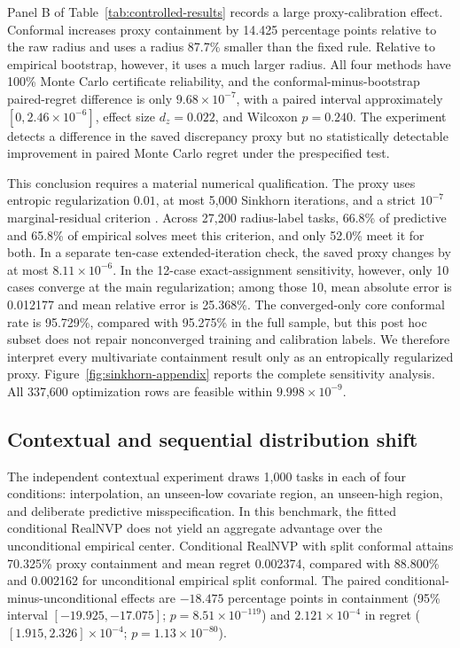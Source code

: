 \documentclass[11pt]{article}
\newcommand{\1}{\mathbf{1}}
\begin{document}
Panel B of Table~\ref{tab:controlled-results} records a large proxy-calibration effect.  Conformal increases proxy containment by 14.425 percentage points relative to the raw radius and uses a radius 87.7\% smaller than the fixed rule.  Relative to empirical bootstrap, however, it uses a much larger radius.  All four methods have 100\% Monte Carlo certificate reliability, and the conformal-minus-bootstrap paired-regret difference is only $9.68\times10^{-7}$, with a paired interval approximately $[0,2.46\times10^{-6}]$, effect size $d_z=0.022$, and Wilcoxon $p=0.240$.  The experiment detects a difference in the saved discrepancy proxy but no statistically detectable improvement in paired Monte Carlo regret under the prespecified test.

This conclusion requires a material numerical qualification.  The proxy uses entropic regularization $0.01$, at most 5,000 Sinkhorn iterations, and a strict $10^{-7}$ marginal-residual criterion \citep{peyre2019computational,feydy2019interpolating}.  Across 27,200 radius-label tasks, 66.8\% of predictive and 65.8\% of empirical solves meet this criterion, and only 52.0\% meet it for both.  In a separate ten-case extended-iteration check, the saved proxy changes by at most $8.11\times10^{-6}$.  In the 12-case exact-assignment sensitivity, however, only 10 cases converge at the main regularization; among those 10, mean absolute error is 0.012177 and mean relative error is 25.368\%.  The converged-only core conformal rate is 95.729\%, compared with 95.275\% in the full sample, but this post hoc subset does not repair nonconverged training and calibration labels.  We therefore interpret every multivariate containment result only as an entropically regularized proxy.  Figure~\ref{fig:sinkhorn-appendix} reports the complete sensitivity analysis.  All 337,600 optimization rows are feasible within $9.998\times10^{-9}$.

\subsection{Contextual and sequential distribution shift}

The independent contextual experiment draws 1,000 tasks in each of four conditions: interpolation, an unseen-low covariate region, an unseen-high region, and deliberate predictive misspecification.  In this benchmark, the fitted conditional RealNVP does not yield an aggregate advantage over the unconditional empirical center.  Conditional RealNVP with split conformal attains 70.325\% proxy containment and mean regret 0.002374, compared with 88.800\% and 0.002162 for unconditional empirical split conformal.  The paired conditional-minus-unconditional effects are $-18.475$ percentage points in containment (95\% interval $[-19.925,-17.075]$; $p=8.51\times10^{-119}$) and $2.121\times10^{-4}$ in regret ($[1.915,2.326]\times10^{-4}$; $p=1.13\times10^{-80}$).
\end{document}

